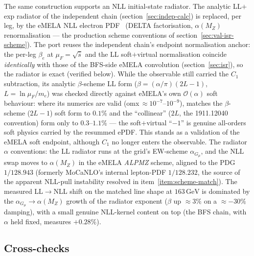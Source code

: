 \documentclass[11pt,a4paper]{article}
\newcommand{\code}[1]{\texttt{\detokenize{#1}}}
\newcommand{\GeV}{\ensuremath{\,\mathrm{GeV}}}
\begin{document}
The same construction supports an NLL initial-state radiator. The analytic LL$+$exp
radiator of the independent chain (section~\ref{sec:indep-calc}) is replaced, per
leg, by the eMELA NLL electron PDF~\cite{eMELA2019} (DELTA factorisation,
$\alpha(M_Z)$ renormalisation --- the production scheme conventions of
section~\ref{sec:val-isr-scheme}). The port reuses the independent chain's endpoint
normalisation anchor: the per-leg $\beta_e$ at $\mu_F=\sqrt{\hat s}$ and the LL
soft$+$virtual normalisation coincide \emph{identically} with those of the BFS-side
eMELA convolution (section~\ref{sec:isr}), so the radiator is exact (verified below).
While the observable still carried the $C_1$ subtraction, its
analytic $\beta$-scheme LL form ($\beta=(\alpha/\pi)(2L-1)$, $L=\ln\mu_F/m_e$)
was checked directly against eMELA's own $\mathcal O(\alpha)$ soft behaviour:
where its numerics are valid (omx\,$\approx\!10^{-7}$--$10^{-9}$),
\code{code_pdf} matches the $\beta$-scheme ($2L-1$) soft form to $0.1\%$ and the
``collinear'' ($2L$, the 1911.12040 convention) form only to $0.3$--$1.1\%$ ---
the soft$+$virtual ``$-1$'' is genuine all-orders soft physics carried by the
resummed ePDF. This stands as a validation of the eMELA soft endpoint,
although $C_1$ no longer enters the observable. The radiator $\alpha$ conventions:
the LL radiator runs at the grid's EW-scheme $\alpha_{G_\mu}$, and the NLL swap moves to
$\alpha(M_Z)$ in the eMELA \emph{ALPMZ} scheme, aligned to the PDG
$1/128.943$ (formerly MoCaNLO's internal lepton-PDF $1/128.232$, the
source of the apparent NLL-pull instability resolved in
item~\ref{item:scheme-match}). The measured LL$\to$NLL shift on the matched line
shape at $163\GeV$ is dominated by the $\alpha_{G_\mu}\!\to\alpha(M_Z)$ growth of the
radiator exponent ($\beta$ up ${\approx}3\%$ on a ${\approx}{-}30\%$ damping), with a
small genuine NLL-kernel content on top (the BFS chain, with $\alpha$ held fixed,
measures $+0.28\%$).

\subsection{Cross-checks}\label{sec:match-val}
\end{document}
